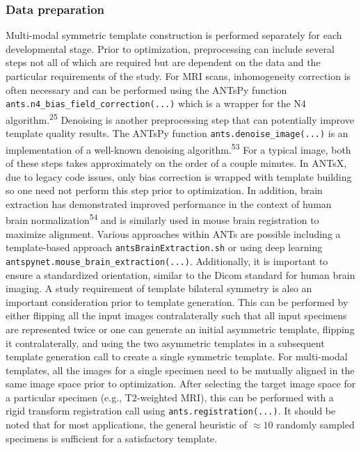 \documentclass[
  12pt,
]{article}
\begin{document}
\hypertarget{data-preparation}{%
\subsubsection*{Data preparation}\label{data-preparation}}

Multi-modal symmetric template construction is performed separately for
each developmental stage. Prior to optimization, preprocessing can
include several steps not all of which are required but are dependent on
the data and the particular requirements of the study. For MRI scans,
inhomogeneity correction is often necessary and can be performed using
the ANTsPy function \texttt{ants.n4\_bias\_field\_correction(...)} which
is a wrapper for the N4 algorithm.\textsuperscript{25} Denoising is
another preprocessing step that can potentially improve template quality
results. The ANTsPy function \texttt{ants.denoise\_image(...)} is an
implementation of a well-known denoising algorithm.\textsuperscript{53}
For a typical image, both of these steps takes approximately on the
order of a couple minutes. In ANTsX, due to legacy code issues, only
bias correction is wrapped with template building so one need not
perform this step prior to optimization. In addition, brain extraction
has demonstrated improved performance in the context of human brain
normalization\textsuperscript{54} and is similarly used in mouse brain
registration to maximize alignment. Various approaches within ANTs are
possible including a template-based approach
\texttt{antsBrainExtraction.sh} or using deep learning
\texttt{antspynet.mouse\_brain\_extraction(...)}. Additionally, it is
important to ensure a standardized orientation, similar to the Dicom
standard for human brain imaging. A study requirement of template
bilateral symmetry is also an important consideration prior to template
generation. This can be performed by either flipping all the input
images contralaterally such that all input specimens are represented
twice or one can generate an initial asymmetric template, flipping it
contralaterally, and using the two asymmetric templates in a subsequent
template generation call to create a single symmetric template. For
multi-modal templates, all the images for a single specimen need to be
mutually aligned in the same image space prior to optimization. After
selecting the target image space for a particular specimen (e.g.,
T2-weighted MRI), this can be performed with a rigid transform
registration call using \texttt{ants.registration(...)}. It should be
noted that for most applications, the general heuristic of
\(\approx 10\) randomly sampled specimens is sufficient for a
satisfactory template.
\end{document}
